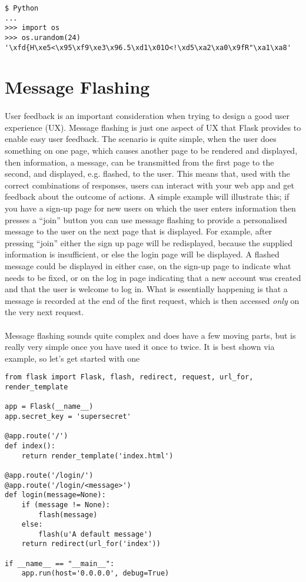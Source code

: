 \documentclass[12pt, a4paper, twoside]{book}
\begin{document}
\begin{lstlisting}
$ Python
...
>>> import os
>>> os.urandom(24)
'\xfd{H\xe5<\x95\xf9\xe3\x96.5\xd1\x01O<!\xd5\xa2\xa0\x9fR"\xa1\xa8'
\end{lstlisting}


\section{Message Flashing}
\label{message-flashing}
\paragraph{} User feedback is an important consideration when trying to design a good user experience (UX). Message flashing is just one aspect of UX that Flask provides to enable easy user feedback. The scenario is quite simple, when the user does something on one page, which causes another page to be rendered and displayed, then information, a message, can be transmitted from the first page to the second, and displayed, e.g. flashed, to the user. This means that, used with the correct combinations of responses, users can interact with your web app and get feedback about the outcome of actions. A simple example will illustrate this; if you have a sign-up page for new users on which the user enters information then presses a ``join'' button you can use message flashing to provide a personalised message to the user on the next page that is displayed. For example, after pressing ``join'' either the sign up page will be redisplayed, because the supplied information is insufficient, or else the login page will be displayed. A flashed message could be displayed in either case, on the sign-up page to indicate what needs to be fixed, or on the log in page indicating that a new account was created and that the user is welcome to log in. What is essentially happening is that a message is recorded at the end of the first request, which is then accessed \emph{only} on the very next request.

\paragraph{} Message flashing sounds quite complex and does have a few moving parts, but is really very simple once you have used it once to twice. It is best shown via example, so let's get started with one

\begin{lstlisting}
from flask import Flask, flash, redirect, request, url_for, render_template

app = Flask(__name__)
app.secret_key = 'supersecret'

@app.route('/')
def index():
    return render_template('index.html')

@app.route('/login/')
@app.route('/login/<message>')
def login(message=None):
    if (message != None):
        flash(message)
    else:
        flash(u'A default message')
    return redirect(url_for('index'))

if __name__ == "__main__":
    app.run(host='0.0.0.0', debug=True)
\end{lstlisting}
\end{document}
